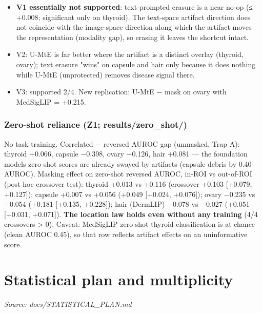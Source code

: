 {\begin{itemize}

\item
  \textbf{V1 essentially not supported}: text-prompted erasure is a near no-op (≤ +0.008; significant only on thyroid).
  The text-space artifact direction does not coincide with the image-space direction along which the artifact moves
  the representation (modality gap), so erasing it leaves the shortcut intact.
\item
  V2: U-MtE is far better where the artifact is a distinct overlay (thyroid, ovary); text erasure "wins" on capsule and
  hair only because it does nothing while U-MtE (unprotected) removes disease signal there.
\item
  V3: supported 2/4. New replication: U-MtE − mask on ovary with MedSigLIP = +0.215.
\end{itemize}

\subsubsection{Zero-shot reliance (Z1; results/zero\_shot/)}\label{zero-shot-reliance-z1-resultszero_shot}

No task training. Correlated − reversed AUROC gap (unmasked, Trap A): thyroid +0.066, capsule −0.398, ovary −0.126,
hair +0.081 --- the foundation models\textquotesingle{} zero-shot scores are already swayed by artifacts (capsule debris by 0.40 AUROC).
Masking effect on zero-shot reversed AUROC, in-ROI vs out-of-ROI (post hoc crossover test):
thyroid +0.013 vs +0.116 (crossover +0.103 {[}+0.079, +0.127{]}); capsule +0.007 vs +0.056 (+0.049 {[}+0.024, +0.076{]});
ovary −0.235 vs −0.054 (+0.181 {[}+0.135, +0.228{]}); hair (DermLIP) −0.078 vs −0.027 (+0.051 {[}+0.031, +0.071{]}).
\textbf{The location law holds even without any training} (4/4 crossovers \textgreater{} 0). Caveat: MedSigLIP zero-shot thyroid
classification is at chance (clean AUROC 0.45), so that row reflects artifact effects on an uninformative score.

}

\section{Statistical plan and multiplicity}\label{doc:STATISTICAL_PLAN}
\noindent\textit{Source: docs/STATISTICAL\_PLAN.md}

